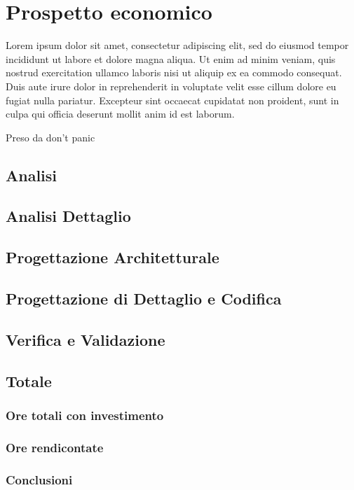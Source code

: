 \newpage
\section{Prospetto economico} \label{ProspettoEconomico}

	Lorem ipsum dolor sit amet, consectetur adipiscing elit, sed do eiusmod tempor incididunt ut labore et dolore magna aliqua. Ut enim ad minim veniam, quis nostrud exercitation ullamco laboris nisi ut aliquip ex ea commodo consequat. Duis aute irure dolor in reprehenderit in voluptate velit esse cillum dolore eu fugiat nulla pariatur. Excepteur sint occaecat cupidatat non proident, sunt in culpa qui officia deserunt mollit anim id est laborum.
	
	Preso da don't panic

	\subsection{Analisi}
	\subsection{Analisi Dettaglio}
	\subsection{Progettazione Architetturale}
	\subsection{Progettazione di Dettaglio e Codifica}
	\subsection{Verifica e Validazione}
	\subsection{Totale}
		\subsubsection{Ore totali con investimento}
		\subsubsection{Ore rendicontate}
		\subsubsection{Conclusioni}